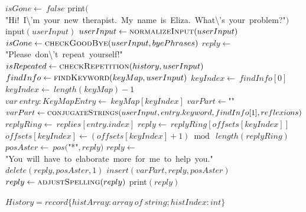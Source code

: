 \documentclass[a4paper,10pt]{article}
\begin{document}
\begin{algorithm}
\begin{algorithmic}[5]
  \State \(isGone\gets\ false\)
  \State \(\)print\((\)"{}Hi!\ I\textbackslash{}'{}m\ your\ new\ therapist.\ My\ name\ is\ Eliza.\ What\textbackslash{}'{}s\ your\ problem?"{}\()\)
  \Repeat
    \State \(\)input\((userInput)\)
    \State {}
    \State {}
    \State \(userInput\gets\Call{normalizeInput}{userInput}\)
    \State \(isGone\gets\Call{checkGoodBye}{userInput,byePhrases}\)
      \State \(reply\gets\)"{}Please\ don\textbackslash{}'{}t\ repeat\ yourself!"{}\(\)
      \State \(isRepeated\gets\Call{checkRepetition}{history,userInput}\)
        \State \(findInfo\gets\Call{findKeyword}{keyMap,userInput}\)
        \State \(keyIndex\gets\ findInfo[0]\)
          \State \(keyIndex\gets\ length(keyMap)-1\)
        \EndIf
        \State \(var\ entry:KeyMapEntry\gets\ keyMap[keyIndex]\)
        \State \(varPart\gets\)"{}"{}\(\)
          \State \(varPart\gets\Call{conjugateStrings}{userInput,entry.keyword,findInfo[1],reflexions}\)
        \EndIf
        \State \(replyRing\gets\ replies[entry.index]\)
        \State \(reply\gets\ replyRing[offsets[keyIndex]]\)
        \State \(offsets[keyIndex]\gets(offsets[keyIndex]+1)\bmod\ length(replyRing)\)
        \State \(posAster\gets\ pos(\)"{}*"{}\(,reply)\)
            \State \(reply\gets\)"{}You\ will\ have\ to\ elaborate\ more\ for\ me\ to\ help\ you."{}\(\)
          \Else
            \State \(delete(reply,posAster,1)\)
            \State \(insert(varPart,reply,posAster)\)
          \EndIf
        \EndIf
        \State \(reply\gets\Call{adjustSpelling}{reply}\)
      \EndIf
      \State \(\)print\((reply)\)
    \EndIf
\EndProcedure
\end{algorithmic}
\end{algorithm}


\begin{algorithm}
\caption{History}
\begin{algorithmic}[5]
\State {}
  \State {}
  \State {}
  \State {}
  \State {}
  \State {}
  \State {}
    \State \(History = record\{histArray:array\ of\ string;histIndex:int\}\)
  \EndDecl
\EndProcedure
\end{algorithmic}
\end{algorithm}
\end{document}
